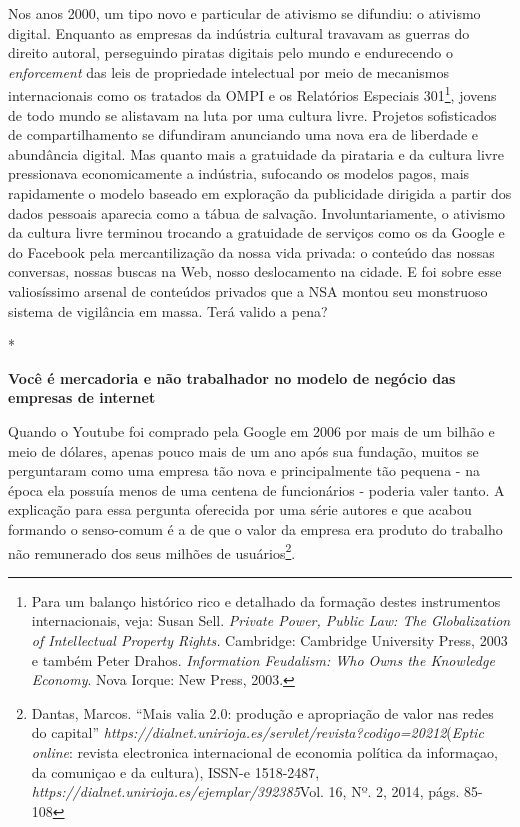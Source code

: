 Nos anos 2000, um tipo novo e particular de ativismo se difundiu: o
ativismo digital. Enquanto as empresas da indústria cultural travavam as
guerras do direito autoral, perseguindo piratas digitais pelo mundo e
endurecendo o \emph{enforcement} das leis de propriedade intelectual por
meio de mecanismos internacionais como os tratados da OMPI e os
Relatórios Especiais 301\footnote{Para um balanço
  histórico rico e detalhado da formação destes instrumentos
  internacionais, veja: Susan Sell. \emph{Private Power, Public Law: The
  Globalization of Intellectual Property Rights.} Cambridge: Cambridge
  University Press, 2003 e também Peter Drahos. \emph{Information
  Feudalism: Who Owns the Knowledge Economy}. Nova Iorque: New Press,
  2003.}, jovens de todo mundo se alistavam na luta por uma cultura
livre. Projetos sofisticados de compartilhamento se difundiram
anunciando uma nova era de liberdade e abundância digital. Mas quanto
mais a gratuidade da pirataria e da cultura livre pressionava
economicamente a indústria, sufocando os modelos pagos, mais rapidamente
o modelo baseado em exploração da publicidade dirigida a partir dos
dados pessoais aparecia como a tábua de salvação. Involuntariamente, o
ativismo da cultura livre terminou trocando a gratuidade de serviços
como os da Google e do Facebook pela mercantilização da nossa vida
privada: o conteúdo das nossas conversas, nossas buscas na Web, nosso
deslocamento na cidade. E foi sobre esse valiosíssimo arsenal de
conteúdos privados que a NSA montou seu monstruoso sistema de vigilância
em massa. Terá valido a pena?

*

\textbf{Você é mercadoria e não trabalhador no modelo de negócio das
empresas de internet}

Quando o Youtube foi comprado pela Google em 2006 por mais de um bilhão
e meio de dólares, apenas pouco mais de um ano após sua fundação, muitos
se perguntaram como uma empresa tão nova e principalmente tão pequena -
na época ela possuía menos de uma centena de funcionários - poderia
valer tanto. A explicação para essa pergunta oferecida por uma série
autores e que acabou formando o senso-comum é a de que o valor da
empresa era produto do trabalho não remunerado dos seus milhões de
usuários\footnote{Dantas, Marcos. ``Mais valia 2.0:
  produção e apropriação de valor nas redes do capital''
  \emph{https://dialnet.unirioja.es/servlet/revista?codigo=20212}(\emph{Eptic
    online}: revista electronica internacional de economia política da
  informaçao, da comuniçao e da cultura), ISSN-e 1518-2487,
  \emph{https://dialnet.unirioja.es/ejemplar/392385}{{Vol. 16, Nº. 2,
  2014}}, págs. 85-108}.

